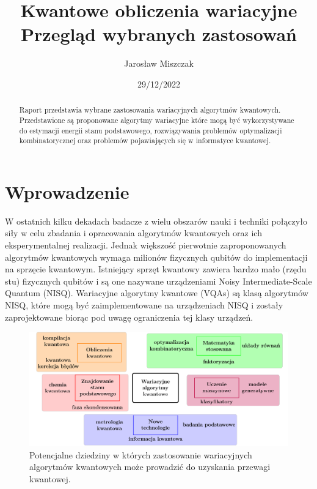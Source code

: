 \documentclass[a4paper,11pt]{article}
\begin{document}
\title{Kwantowe obliczenia wariacyjne\\ {\normalsize Przegląd wybranych zastosowań}}

\author{Jarosław Miszczak}
\date{29/12/2022}

\maketitle

\begin{abstract}
Raport przedstawia wybrane zastosowania wariacyjnych algorytmów kwantowych. Przedstawione są proponowane algorytmy wariacyjne które mogą być wykorzystywane do estymacji energii stanu podstawowego, rozwiązywania problemów optymalizacji kombinatorycznej oraz problemów pojawiających się w informatyce kwantowej.
\end{abstract}

\tableofcontents

\newpage


\hypertarget{wprowadzenie}{%
\section{Wprowadzenie}\label{wprowadzenie}}

W ostatnich kilku dekadach badacze z wielu obszarów nauki i techniki połączyło siły w celu zbadania i opracowania algorytmów kwantowych oraz ich eksperymentalnej realizacji. Jednak większość pierwotnie zaproponowanych algorytmów kwantowych wymaga milionów fizycznych qubitów do implementacji na sprzęcie kwantowym. Istniejący sprzęt kwantowy zawiera bardzo mało (rzędu stu) fizycznych qubitów i są one nazywane urządzeniami Noisy Intermediate-Scale Quantum (NISQ). Wariacyjne algorytmy kwantowe (VQAs) są klasą algorytmów NISQ, które mogą być zaimplementowane na urządzeniach NISQ i zostały zaprojektowane biorąc pod uwagę ograniczenia tej klasy urządzeń.

\begin{figure}[ht!]
	\centering
	\includegraphics[width=\textwidth]{vqa-applications-pl}
	\caption{Potencjalne dziedziny w których zastosowanie wariacyjnych algorytmów kwantowych może prowadzić do uzyskania przewagi kwantowej.}
\end{figure}
\end{document}
